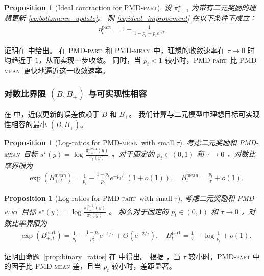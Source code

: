 \documentclass{article}
\theoremstyle{plain}
\newtheorem{proposition}[theorem]{Proposition}
\theoremstyle{definition}
\theoremstyle{remark}
\newcommand{\pmdmean}{\textsc{PMD-mean}}
\newcommand{\pmdpart}{\textsc{PMD-part}}
\begin{document}
\begin{proposition}[Ideal contraction for \pmdpart]
\label{prop:eta_part_exact}
设 $\pi^\star_{t+1}$ 为带有二元奖励的理想更新 \eqref{eq:boltzmann_update}。  
则 \eqref{eq:ideal_improvement} 在以下条件下成立：
\begin{align}
    \eta_t^{\mathrm{part}}
    =1-\frac{1}{1-p_t+p_te^{1/\tau}}.
    \label{eq:eta_part_exact}
\end{align}
\end{proposition}
证明在  中给出。  
在 \textsc{PMD-part}\ 和 \textsc{PMD-mean}\ 中，理想的收敛速率在 $\tau\to 0$ 时均趋近于 $1$，从而实现一步收敛。  
同时，当 $p_t<1$ 较小时，\textsc{PMD-part}\ 比 \textsc{PMD-mean}\ 更快地逼近这一收敛速率。 



\subsubsection{对数比界限 $(B,B_+)$  与可实现性相容}
\label{sec:BB_instantiation}
在  中，近似更新的误差依赖于 $B$ 和 $B_+$。  
我们计算与二元模型中理想目标可实现性相容的最小 $(B,B_+)$。
\begin{proposition}[Log-ratios for \pmdmean\ with small $\tau$]
\label{prop:BB_mean_asymp}
    考虑二元奖励和 \textsc{PMD-mean}\ 目标 $s^\star(y)=\log\frac{\pi^\mathrm{mean}_{t+1}(y)}{\pi_t(y)}$ 。对于固定的 $p_t\in(0,1)$  和 $\tau\to 0$ ，对数比率界限为 
    \begin{align*}
        &\exp(B_{+,t}^{\mathrm{mean}})
        =\frac{1}{p_t}-\frac{1-p_t}{p_t}e^{-p_t/\tau}(1+o(1)), \quad B_{t}^{\mathrm{mean}}
        =\frac{p_t}{\tau}+o(1).
    \end{align*}
\end{proposition}

\begin{proposition}[Log-ratios for \pmdpart\ with small $\tau$]\label{prop:BB_part_exact}
    考虑二元奖励和 \textsc{PMD-part}\ 目标 $s^\star(y)=\log\frac{\pi^\mathrm{part}_{t+1}(y)}{\pi_t(y)}$ 。
    那么对于固定的 $p_t\in(0,1)$  和 $\tau\to 0$ ，对数比率界限为 
    \begin{align*}
        &\exp(B_{+,t}^{\mathrm{part}})=\frac{1}{p_t} - \frac{1-p_t}{p_t^2}e^{-1/\tau} + O(e^{-2/\tau}),
        \quad B_{t}^{\mathrm{part}} = \frac{1}{\tau}-\log\frac{1}{p_t} + o(1).
    \end{align*}
\end{proposition}
证明由命题~\ref{prop:binary_ratios} 在  中得出。  
根据 ，当 $\tau$ 较小时，\textsc{PMD-part} 中的因子比 \textsc{PMD-mean} 差，且当 $p_t$ 较小时，差距显著。 
\end{document}
